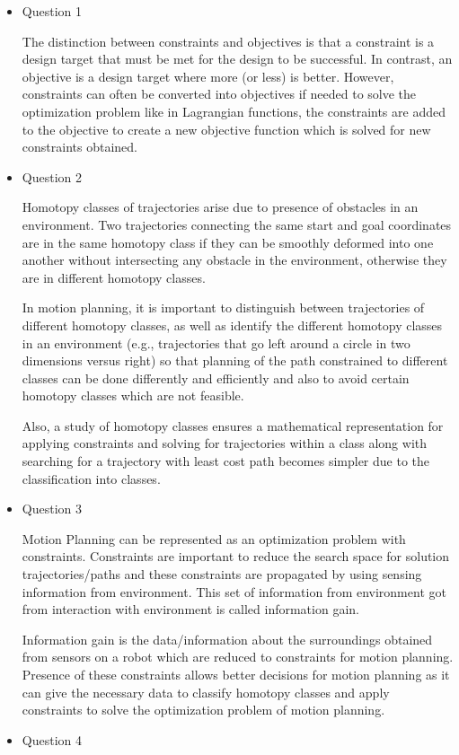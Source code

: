 \documentclass[paper=a4, fontsize=11pt]{scrartcl} %
\numberwithin{equation}{section} %
\numberwithin{figure}{section} %
\numberwithin{table}{section} %
\begin{document}
\begin{itemize}
\item Question 1

The distinction between constraints and objectives is that a constraint is a design target that must be met for the design to be successful. In contrast, an objective is a design target where more (or less) is better. 
However, constraints can often be converted into objectives if needed to solve the optimization problem like in Lagrangian functions, the constraints are added to the objective to create a new objective function which is solved for new constraints obtained.

\item Question 2

Homotopy classes of trajectories arise due to presence of obstacles in an environment. Two trajectories connecting the same start and goal coordinates are in the same homotopy class if they can be smoothly deformed into one another without intersecting any obstacle in the environment, otherwise they are in different homotopy classes.
 
In motion planning, it is important to distinguish between trajectories of different homotopy classes, as well as identify the different homotopy classes in an environment (e.g., trajectories that go left around a circle in two dimensions versus right) so that planning of the path constrained to different classes can be done differently and efficiently and also to avoid certain homotopy classes which are not feasible.

Also, a study of homotopy classes ensures a mathematical representation for applying constraints and solving for trajectories within a class along with searching for a trajectory with least cost path becomes simpler due to the classification into classes.

\item Question 3

Motion Planning can be represented as an optimization problem with constraints. Constraints are important to reduce the search space for solution trajectories/paths and these constraints are propagated by using sensing information from environment. This set of information from environment got from interaction with environment is called information gain.

Information gain is the data/information about the surroundings obtained from sensors on a robot which are reduced to constraints for motion planning. Presence of these constraints allows better decisions for motion planning as it can give the necessary data to classify homotopy classes and apply constraints to solve the optimization problem of motion planning. 
\item Question 4


\end{itemize}
\end{document}
